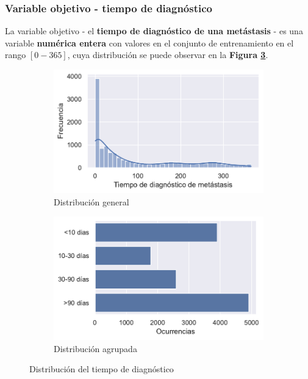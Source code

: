 \subsubsection{Variable objetivo - tiempo de diagnóstico}

La variable objetivo - el \textbf{tiempo de diagnóstico de una metástasis} - es una variable \textbf{numérica entera} con valores en el conjunto de entrenamiento en el rango $[0-365]$, cuya distribución se puede observar en la \textbf{Figura \ref{fig:ch3varobjetivo}}.

\begin{figure}[h]
	\begin{center}
		\begin{subfigure}{0.45\linewidth}
			\begin{center}
				\includegraphics[width=\linewidth]{figs/chapter3/objectivevariable/diagnosisperioddistribution.pdf}
				\caption{Distribución general}\label{fig:ch3general}
			\end{center}
		\end{subfigure} 
		\begin{subfigure}{0.45\linewidth}
			\begin{center}
				\includegraphics[width=\linewidth]{figs/chapter3/objectivevariable/diagnosisperiodgrouped.pdf}
				\caption{Distribución agrupada}\label{fig:ch3group}
			\end{center}
		\end{subfigure} 
	\end{center}
	\captionsetup{aboveskip=-5pt, belowskip=-15pt}
	\caption{Distribución del tiempo de diagnóstico}
	\label{fig:ch3varobjetivo}
\end{figure}

